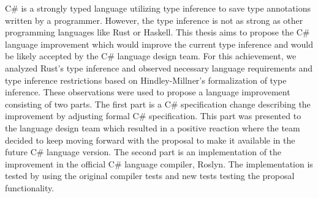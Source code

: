 \documentclass[12pt]{report}
\begin{document}

C\# is a strongly typed language utilizing type inference to save type annotations written by a programmer. 
However, the type inference is not as strong as other programming languages like Rust or Haskell.
This thesis aims to propose the C\# language improvement which would improve the current type inference and would be likely accepted by the C\# language design team. For this achievement, we analyzed Rust's type inference and observed necessary language requirements and type inference restrictions based on Hindley-Millner's formalization of type inference. 
These observations were used to propose a language improvement consisting of two parts. 
The first part is a C\# specification change describing the improvement by adjusting formal C\# specification. 
This part was presented to the language design team which resulted in a positive reaction where the team decided to keep moving forward with the proposal to make it available in the future C\# language version. 
The second part is an implementation of the improvement in the official C\# language compiler, Roslyn. 
The implementation is tested by using the original compiler tests and new tests testing the proposal functionality.  
\end{document}

